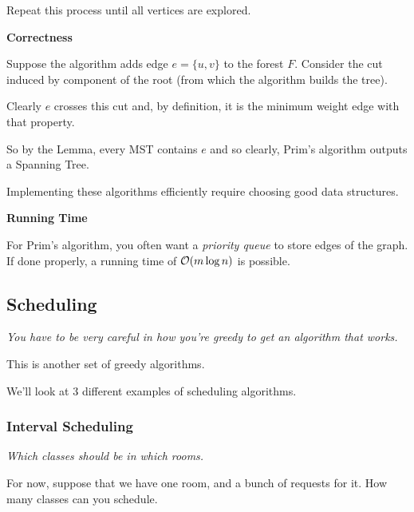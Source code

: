 \documentclass[12pt]{article}
\begin{document}
  Repeat this process until all vertices are explored.

  {\bf Correctness}

  {
    Suppose the algorithm adds edge $e = \{u, v\}$ to the forest $F$. Consider the
    cut induced by component of the root (from which the algorithm builds the
    tree).

    Clearly $e$ crosses this cut and, by definition, it is the minimum weight edge
    with that property.

    So by the Lemma, every MST contains $e$ and so clearly, Prim's algorithm
    outputs a Spanning Tree.
  }


  Implementing these algorithms efficiently require choosing good data structures.

  {\bf Running Time}

  For Prim's algorithm, you often want a {\it priority queue} to store edges of
  the graph. If done properly, a running time of $\mathcal O(m\log n)$ is possible.

  \subsection{Scheduling}


  {\it You have to be very careful in how you're greedy to get an algorithm that
  works.}

  This is another set of greedy algorithms.


  We'll look at 3 different examples of scheduling algorithms. 

  \subsubsection{Interval Scheduling}

  {\it Which classes should be in which rooms.}

  For now, suppose that we have one room, and a bunch of requests for it. How many
  classes can you schedule.
\end{document}
